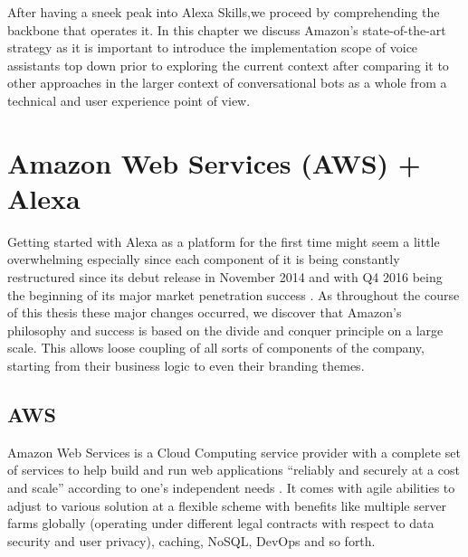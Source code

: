 %



After having a sneek peak into Alexa Skills,we proceed by comprehending the backbone that operates it.
In this chapter we discuss Amazon's state-of-the-art strategy
as it is important to introduce the implementation scope of voice assistants 
top down
prior to exploring the current context 
after comparing it to other approaches in the larger context of conversational bots as a whole from a technical and user experience point of view. 


\section[Amazon Web Services + Alexa]{Amazon Web Services (AWS) + Alexa}


Getting started with Alexa as a platform for the first time might seem a little overwhelming especially since each component of it is being  constantly restructured since its debut release in November 2014 and with Q4 2016 being the beginning of its major market penetration success \cite{gartnerpreds17}. %
As throughout the course of this thesis these major changes occurred, we discover that Amazon's philosophy and success is based on the divide and conquer principle on  a large scale. This allows loose coupling of all sorts of components of the company, starting from their business logic to even their branding themes. %
 

\subsection*{AWS}
Amazon Web Services is a Cloud Computing service provider with a complete set of services to help build and run web applications ``reliably and securely at a cost and scale'' according to one's independent needs \cite{aws_website}.
It comes with agile abilities to adjust to various solution at a flexible scheme with benefits like multiple server farms globally (operating under different legal contracts with respect to data security and user privacy), caching, NoSQL, DevOps and so forth.


